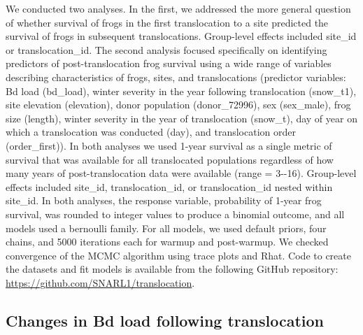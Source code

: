 \documentclass[9pt,twocolumn,twoside,lineno]{pnas-new}
\begin{document}
{We conducted two analyses. In the first, we addressed the more general
question of whether survival of frogs in the first translocation to a
site predicted the survival of frogs in subsequent translocations.
Group-level effects included site\_id or translocation\_id. The second
analysis focused specifically on identifying predictors of
post-translocation frog survival using a wide range of variables
describing characteristics of frogs, sites, and translocations
(predictor variables: Bd load (bd\_load), winter severity in the year
following translocation (snow\_t1), site elevation (elevation), donor
population (donor\_72996), sex (sex\_male), frog size (length), winter
severity in the year of translocation (snow\_t), day of year on which a
translocation was conducted (day), and translocation order
(order\_first)). In both analyses we used 1-year survival as a single
metric of survival that was available for all translocated populations
regardless of how many years of post-translocation data were available
(range = 3-\/-16). Group-level effects included site\_id,
translocation\_id, or translocation\_id nested within site\_id. In both
analyses, the response variable, probability of 1-year frog survival,
was rounded to integer values to produce a binomial outcome, and all
models used a bernoulli family. For all models, we used default priors,
four chains, and 5000 iterations each for warmup and post-warmup. We
checked convergence of the MCMC algorithm using trace plots and Rhat.
Code to create the datasets and fit models is available from the
following GitHub repository:
\url{https://github.com/SNARL1/translocation}.

\hypertarget{changes-in-bd-load-following-translocation}{%
\subsection*{Changes in Bd load following
translocation}\label{changes-in-bd-load-following-translocation}}

}
\end{document}
